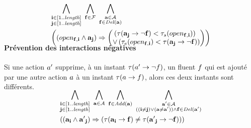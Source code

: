 \begin{small}
\begin{multline*}
~\\[-3em]
\bigwedge\limits_{\substack{\mathbf{i}\in [1..\mathbf{\length}]\\ \mathbf{j}\in [1..\mathbf{\length}]}}%
~\bigwedge\limits_{\substack{\mathbf{\f}\in \mathbf{\F}}}~\bigwedge\limits_{\substack{\mathbf{\a}\in \mathbf{\A}\\\mathbf{\f} \in \del{\mathbf{\a}}}}\hfill\\
\left(\left(open_{\mathbf{\f},\mathbf{i}} \wedge \mathbf{\a}_{\mathbf{j}}\right) \Rightarrow \begin{pmatrix}\left(\tau(\mathbf{\a}_\mathbf{j}\rightarrow \neg \mathbf{\f}) < \tau_{s}(open_{\mathbf{\f},\mathbf{i}})\right)\hfill\\
 \vee \left(\tau_{e}(open_{\mathbf{\f},\mathbf{i}}) < \tau(\mathbf{\a}_\mathbf{j}\rightarrow \neg \mathbf{\f})\right)\end{pmatrix}\right)\hfill\\[-2em]
\end{multline*}
\end{small}


\paragraph*{Pr\'{e}vention des interactions n\'{e}gatives}

Si une action $a'$ supprime, \`{a} un instant $\tau(a'\rightarrow\neg f)$, un fluent $f$ qui est ajout\'{e} par une autre action $a$ \`{a} un instant $\tau(a\rightarrow f)$, alors ces deux instants sont diff\'{e}rents.

\begin{small}
\begin{multline*}
~\\[-3em]
\bigwedge\limits_{\substack{\mathbf{i}\in [1..\mathbf{\length}]\\ \mathbf{j}\in [1..\mathbf{\length}]}}%
~\bigwedge\limits_{\substack{\mathbf{\a}\in \mathbf{\A}}}~\bigwedge\limits_{\substack{\mathbf{\f}\in \add{\mathbf{\a}}}}~\bigwedge\limits_{\substack{\mathbf{\b}\in \mathbf{\A}\\((\mathbf{i} \neq \mathbf{j}) \vee (\mathbf{\a} \neq \mathbf{\b})) \wedge \mathbf{\f} \in \del{\mathbf{\b}}}}\hfill\\
\left(\left(\mathbf{\a}_{\mathbf{i}} \wedge \mathbf{\b}_{\mathbf{j}}\right) \Rightarrow %
\left(\tau(\mathbf{\a}_\mathbf{i}\rightarrow \mathbf{\f}) \neq \tau(\mathbf{\b}_\mathbf{j}\rightarrow \neg \mathbf{\f})\right)\hfill%
\right)\hfill\\[-2em]
\end{multline*}
\end{small}

